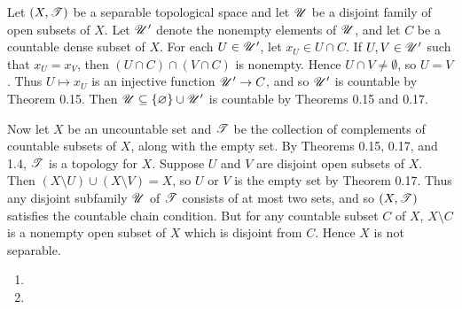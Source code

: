 \begin{prob}
Let $(X, \mathscr{T})$ be a separable topological space and let $\mathscr{U}$ be a disjoint family of open subsets of $X$. Let $\mathscr{U}'$ denote the nonempty elements of $\mathscr{U}$, and let $C$ be a countable dense subset of $X$. For each $U \in \mathscr{U}'$, let $x_U \in U\cap C$. If $U, V \in \mathscr{U}'$ such that $x_U = x_V$, then $(U\cap C)\cap (V\cap C)$ is nonempty. Hence $U\cap V \not = \emptyset$, so $U = V$. Thus $U \mapsto x_U$ is an injective function $\mathscr{U}' \to C$, and so $\mathscr{U}'$ is countable by Theorem 0.15. Then $\mathscr{U} \subseteq \{\varnothing\}\cup\mathscr{U}'$ is countable by Theorems 0.15 and 0.17.

Now let $X$ be an uncountable set and $\mathscr{T}$ be the collection of complements of countable subsets of $X$, along with the empty set. By Theorems 0.15, 0.17, and 1.4, $\mathscr{T}$ is a topology for $X$. Suppose $U$ and $V$ are disjoint open subsets of $X$. Then $(X\setminus U)\cup (X\setminus V) = X$, so $U$ or $V$ is the empty set by Theorem 0.17. Thus any disjoint subfamily $\mathscr{U}$ of $\mathscr{T}$ consists of at most two sets, and so $(X, \mathscr{T})$ satisfies the countable chain condition. But for any countable subset $C$ of $X$, $X\setminus C$ is a nonempty open subset of $X$ which is disjoint from $C$. Hence $X$ is not separable.
\end{prob}

\begin{prob}
\begin{enumerate}
\item 

\item 
\end{enumerate}
\end{prob}

\begin{prob}

\end{prob}

\begin{prob}

\end{prob}

